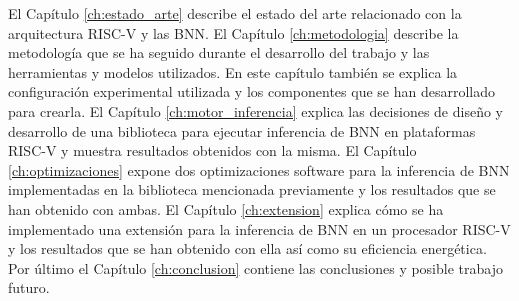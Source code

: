 El Capítulo \ref{ch:estado_arte} describe el estado del arte relacionado con la arquitectura RISC-V y las BNN. El Capítulo \ref{ch:metodologia} describe la metodología que se ha seguido durante el desarrollo del trabajo y las herramientas y modelos utilizados. En este capítulo también se explica la configuración experimental utilizada y los componentes que se han desarrollado para crearla. El Capítulo \ref{ch:motor_inferencia} explica las decisiones de diseño y desarrollo de una biblioteca para ejecutar inferencia de BNN en plataformas RISC-V y muestra resultados obtenidos con la misma. El Capítulo \ref{ch:optimizaciones} expone dos optimizaciones software para la inferencia de BNN implementadas en la biblioteca mencionada previamente y los resultados que se han obtenido con ambas. El Capítulo \ref{ch:extension} explica cómo se ha implementado una extensión para la inferencia de BNN en un procesador RISC-V y los resultados que se han obtenido con ella así como su eficiencia energética. Por último el Capítulo \ref{ch:conclusion} contiene las conclusiones y posible trabajo futuro.
